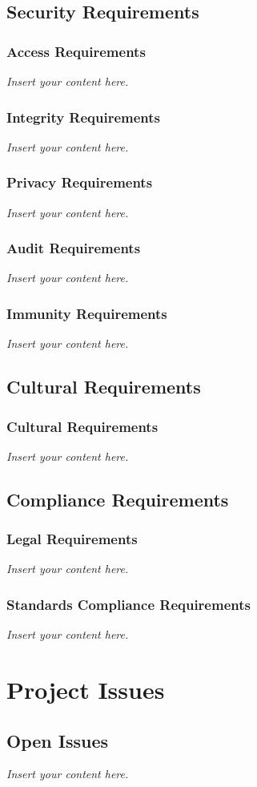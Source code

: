 \documentclass[12pt]{article}
\newcommand{\lips}{\textit{Insert your content here.}}
\begin{document}
\subsection{Security Requirements}
\subsubsection{Access Requirements}
\lips
\subsubsection{Integrity Requirements}
\lips
\subsubsection{Privacy Requirements}
\lips
\subsubsection{Audit Requirements}
\lips
\subsubsection{Immunity Requirements}
\lips

\subsection{Cultural Requirements}
\subsubsection{Cultural Requirements}
\lips

\subsection{Compliance Requirements}
\subsubsection{Legal Requirements}
\lips
\subsubsection{Standards Compliance Requirements}
\lips

\section{Project Issues}
\subsection{Open Issues}
\lips
\end{document}
